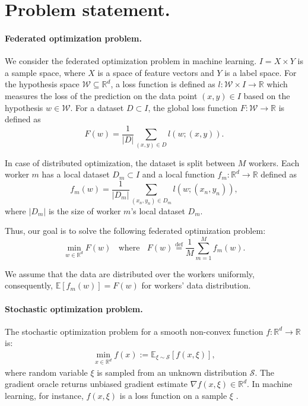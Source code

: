 \documentclass{article}
\newcommand{\EE}{\mathbb{E}}
\newcommand{\R}{\mathbb{R}}
\begin{document}
\section{Problem statement.}
\paragraph{Federated optimization problem.}
We consider the federated optimization problem in machine learning. $I = X \times Y$ is a sample space, where $X$ is a space of feature vectors and $Y$ is a label space. For the hypothesis space $\mathcal{W} \subseteq \R^d$, a loss function is defined as $l: \mathcal{W}\times I \rightarrow \R$ which measures the loss of the prediction on the data point $(x,y) \in I$ based on the hypothesis $w \in \mathcal{W}$. For a dataset $D \subset I$, the global loss function $F:\mathcal{W}\to \R$ is defined as
\begin{equation}
F(w) = \frac{1}{|D|}\sum_{(x,y)\in D}l(w;(x,y)).
\end{equation}

In case of distributed optimization, the dataset is split between $M$ workers. Each worker $m$ has a local dataset $D_m \subset I$ and a local function $f_m:\R^d \to \R$ defined as
\begin{equation}
f_m(w)=\frac{1}{|D_m|}\sum_{(x_n,y_n)\in D_m}l(w;(x_n,y_n)),
\end{equation}
where $|D_m|$ is the size of worker $m$'s local dataset $D_m$.

Thus, our goal is to solve the following federated optimization problem:
\begin{equation}
\min_{w\in \R^d}F(w)~~~~ \text{where}~~~~ F(w) \overset{\mathrm{def}}{=} \frac{1}{M}\sum_{m=1}^{M}f_{m}(w).
\end{equation}

We assume that the data are distributed over the workers uniformly, consequently, $\EE[f_{m}(w)]=F(w)$ for workers' data distribution.
  
\paragraph{Stochastic optimization problem.} The stochastic optimization problem for a smooth non-convex function $f:\R^d \to \R$ is:
\begin{eqnarray}
    \min\limits_{x \in \R^d} f(x) := \EE_{\xi \sim \mathcal{S}} [f(x, \xi)],\label{eq: min problem}
\end{eqnarray}
where random variable $\xi$ is sampled from an unknown distribution $\mathcal{S}.$ The gradient oracle returns unbiased gradient estimate $\nabla f (x, \xi) \in \R^d$. In machine learning, for instance, $f(x, \xi)$ is a loss function on a sample $\xi$ \parencite{ShalevShwartz2014}.
\end{document}
